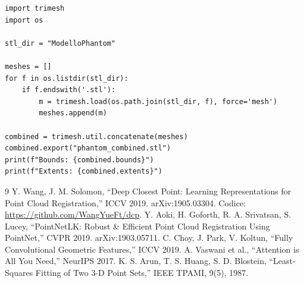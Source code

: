 \documentclass[11pt,a4paper]{article}
\begin{document}
\begin{lstlisting}[caption={unify.py}]
import trimesh
import os

stl_dir = "ModelloPhantom"

meshes = []
for f in os.listdir(stl_dir):
    if f.endswith('.stl'):
        m = trimesh.load(os.path.join(stl_dir, f), force='mesh')
        meshes.append(m)

combined = trimesh.util.concatenate(meshes)
combined.export("phantom_combined.stl")
print(f"Bounds: {combined.bounds}")
print(f"Extents: {combined.extents}")
\end{lstlisting}

\begin{thebibliography}{9}
 Y. Wang, J. M. Solomon, ``Deep Closest Point: Learning Representations for Point Cloud Registration,'' ICCV 2019. arXiv:1905.03304. Codice: \url{https://github.com/WangYueFt/dcp}.
 Y. Aoki, H. Goforth, R. A. Srivatsan, S. Lucey, ``PointNetLK: Robust \& Efficient Point Cloud Registration Using PointNet,'' CVPR 2019. arXiv:1903.05711.
 C. Choy, J. Park, V. Koltun, ``Fully Convolutional Geometric Features,'' ICCV 2019.
 A. Vaswani et al., ``Attention is All You Need,'' NeurIPS 2017.
 K. S. Arun, T. S. Huang, S. D. Blostein, ``Least-Squares Fitting of Two 3-D Point Sets,'' IEEE TPAMI, 9(5), 1987.
\end{thebibliography}
\end{document}
